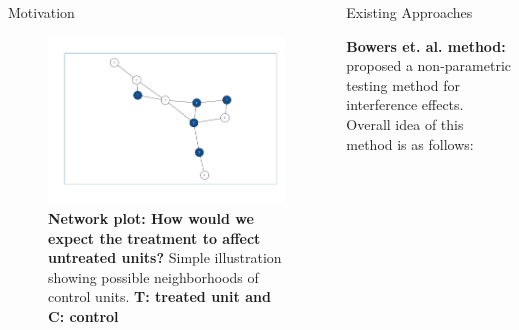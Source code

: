 \documentclass[final]{beamer}
\newlength{\onecolwid}
\newlength{\onecolwidd}
\begin{document}
\begin{frame}[t]
\begin{columns}[t]
\begin{column}{\onecolwidd}
\begin{block}{Motivation}
\centering
\begin{figure}
\centering
\includegraphics[scale=0.9]{Dummy_network.pdf}
\vspace*{-15mm}
\caption{\small \textbf{Network plot: How would we expect the treatment to affect untreated units?} Simple illustration showing possible neighborhoods of control units. \textbf{T: treated unit and C: control}}
\end{figure}	
	
	
	
	\end{block}
	

\end{column}		
	\begin{column}{\onecolwidd}
	
	\begin{block}{Existing Approaches}
		\begin{rmfamily}
	
	{\large \textbf{Bowers et. al. method:}}\\
	\citealt{bowers2012reasoning} proposed a non-parametric testing method for interference effects. Overall idea of this method is as follows:


\end{rmfamily}
\end{block}
\end{column}
\end{columns}
\end{frame}
\end{document}
